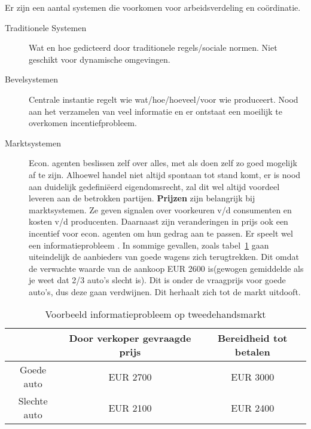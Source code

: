 Er zijn een aantal systemen die voorkomen voor arbeidsverdeling en co\"{o}rdinatie.
\begin{description}
	\item[Traditionele Systemen] Wat en hoe gedicteerd door traditionele regels/sociale normen. Niet geschikt voor dynamische omgevingen.
    \item[Bevelsystemen] Centrale instantie regelt wie wat/hoe/hoeveel/voor wie produceert. Nood aan het verzamelen van veel informatie en er ontstaat een moeilijk te overkomen incentiefprobleem.
    \item[Marktsystemen] Econ. agenten beslissen zelf over alles, met als doen zelf zo goed mogelijk af te zijn. Alhoewel handel niet  altijd spontaan tot stand komt, er is nood aan duidelijk gedefini\"{e}erd eigendomsrecht, zal dit wel altijd voordeel leveren aan de betrokken partijen. \textbf{Prijzen} zijn belangrijk bij marktsystemen. Ze geven signalen over voorkeuren v/d consumenten en kosten v/d producenten. Daarnaast zijn veranderingen in prijs ook een incentief voor econ. agenten om hun gedrag aan te passen. Er speelt wel een informatieprobleem . In sommige gevallen, zoals tabel~\ref{tab:tweedeHands} gaan uiteindelijk de aanbieders van goede wagens zich terugtrekken. Dit omdat de verwachte waarde van de aankoop EUR 2600 is(gewogen gemiddelde als je weet dat 2/3 auto's slecht is). Dit is onder de vraagprijs voor goede auto's, dus deze gaan verdwijnen. Dit herhaalt zich tot de markt uitdooft.
\end{description}
\begin{table}[h]
	\centering
    \begin{tabular}{ | c |  c |  c | }
		\hline
		& Door verkoper gevraagde prijs  &  Bereidheid tot betalen \\
		\hline
		 Goede auto & EUR 2700 & EUR 3000 \\
		\hline
		Slechte auto & EUR 2100 & EUR 2400\\
		\hline
	\end{tabular}
	\caption{Voorbeeld informatieprobleem op tweedehandsmarkt}
    \label{tab:tweedeHands}
\end{table}
